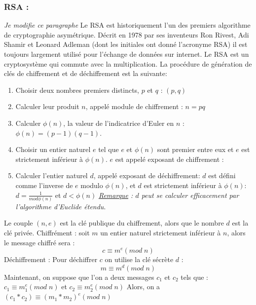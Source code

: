 \documentclass[a4paper,12pt]{report}
\begin{document}
\subsubsection{RSA :}\textit{Je modifie ce paragraphe}
Le RSA est historiquement l'un des premiers  algorithme de cryptographie asymétrique. Décrit en 1978 par ses inventeurs Ron Rivest, Adi Shamir et Leonard Adleman (dont les initiales ont donné l'acronyme RSA) il est toujours largement utilisé pour l'échange de données sur internet. Le RSA est un cryptosystème qui commute avec la multiplication.\newline
La procédure de génération de clés de chiffrement et de déchiffrement est la suivante:
\begin{enumerate}
\item Choisir deux nombres premiers distincts,  $p$ et $q$ : $(p,q)$
\item Calculer leur produit $n$, appelé module de chiffrement : $n = pq$
\item Calculer $\phi(n)$, la valeur de l'indicatrice d'Euler en $n$ : $\phi(n) = (p - 1)(q -1)$.
\item Choisir un entier naturel $e$ tel que $e$ et $\phi(n)$ sont  premier entre eux et $e$ est strictement inférieur à $\phi(n)$. $e$ est appelé exposant de chiffrement :
\item Calculer l'entier naturel $d$, appelé exposant de déchiffrement:
  $d$ est défini comme l'inverse de $e$ modulo $\phi(n)$, et $d$ est strictement inférieur à $\phi(n)$:
$d=\frac{1}{mod\phi(n)}$ et $d<\phi(n)$
  \textit{\underline{Remarque} : $d$ peut se calculer efficacement par l'algorithme d'Euclide étendu}.
\end{enumerate}
Le couple $(n,e)$ est la clé publique du chiffrement, alors que le nombre $d$ est la clé privée.\newline
Chiffrément :\newline 
soit $m$ un entier naturel strictement inférieur à $n$, alors le message chiffré sera :\newline
$$c \equiv m^e(mod\; n)$$
Déchiffrement :\newline
Pour déchiffrer $c$ on utilise la clé sécrète $d$ :\newline
$$m \equiv m^d(mod\; n)$$
Maintenant, on suppose que l'on a deux messages $c_1$ et $c_2$ tels que :
$c_1 \equiv m_1^e(mod\; n)$ et $c_2 \equiv m_2^e(mod\; n)$ \newline
Alors, on a $(c_1*c_2) \equiv (m_1*m_2)^e(mod\; n)$\newline
\newline
\end{document}

